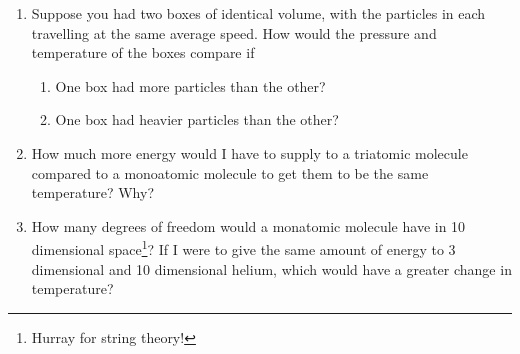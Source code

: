 \begin{enumerate}
    \item Suppose you had two boxes of identical volume, with the particles in each travelling at the same average speed. How would the pressure and temperature of the boxes compare if
    \begin{enumerate}
        \item One box had more particles than the other?
        \item One box had heavier particles than the other?
    \end{enumerate}
    \item How much more energy would I have to supply to a triatomic molecule compared to a monoatomic molecule to get them to be the same temperature? Why?
    \item How many degrees of freedom would a monatomic molecule have in 10 dimensional space\footnote{Hurray for string theory!}? If I were to give the same amount of energy to 3 dimensional and 10 dimensional helium, which would have a greater change in temperature?


\end{enumerate}